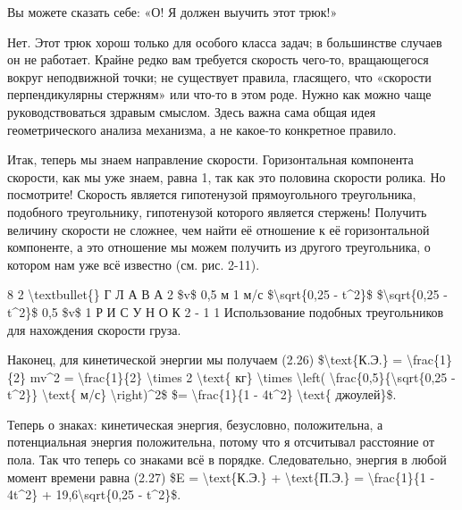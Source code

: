 \documentclass[10pt,oneside]{article}
\begin{document}
Вы можете сказать себе: «О! Я должен выучить этот трюк!»\par

Нет. Этот трюк хорош только для особого класса задач; в большинстве случаев он не работает. Крайне редко вам требуется скорость чего-то, вращающегося вокруг неподвижной точки; не существует правила, гласящего, что «скорости перпендикулярны стержням» или что-то в этом роде. Нужно как можно чаще руководствоваться здравым смыслом. Здесь важна сама общая идея геометрического анализа механизма, а не какое-то конкретное правило.\par

Итак, теперь мы знаем направление скорости. Горизонтальная компонента скорости, как мы уже знаем, равна 1, так как это половина скорости ролика. Но посмотрите! Скорость является гипотенузой прямоугольного треугольника, подобного треугольнику, гипотенузой которого является стержень! Получить величину скорости не сложнее, чем найти её отношение к её горизонтальной компоненте, а это отношение мы можем получить из другого треугольника, о котором нам уже всё известно (см. рис. 2-11).\par

8 2 \textbackslash{}textbullet\{\} Г Л А В А  2 \$v\$ 0,5 м 1 м/с \$\textbackslash{}sqrt\{0,25 - t\textasciicircum{}2\}\$ \$\textbackslash{}sqrt\{0,25 - t\textasciicircum{}2\}\$ 0,5 \$v\$ 1 Р И С У Н О К  2 - 1 1 Использование подобных треугольников для нахождения скорости груза.\par

Наконец, для кинетической энергии мы получаем (2.26) \$\textbackslash{}text\{К.Э.\} = \textbackslash{}frac\{1\}\{2\} mv\textasciicircum{}2 = \textbackslash{}frac\{1\}\{2\} \textbackslash{}times 2 \textbackslash{}text\{ кг\} \textbackslash{}times \textbackslash{}left( \textbackslash{}frac\{0,5\}\{\textbackslash{}sqrt\{0,25 - t\textasciicircum{}2\}\} \textbackslash{}text\{ м/с\} \textbackslash{}right)\textasciicircum{}2\$ \$= \textbackslash{}frac\{1\}\{1 - 4t\textasciicircum{}2\} \textbackslash{}text\{ джоулей\}\$.\par

Теперь о знаках: кинетическая энергия, безусловно, положительна, а потенциальная энергия положительна, потому что я отсчитывал расстояние от пола. Так что теперь со знаками всё в порядке. Следовательно, энергия в любой момент времени равна (2.27) \$E = \textbackslash{}text\{К.Э.\} + \textbackslash{}text\{П.Э.\} = \textbackslash{}frac\{1\}\{1 - 4t\textasciicircum{}2\} + 19,6\textbackslash{}sqrt\{0,25 - t\textasciicircum{}2\}\$.\par
\end{document}
